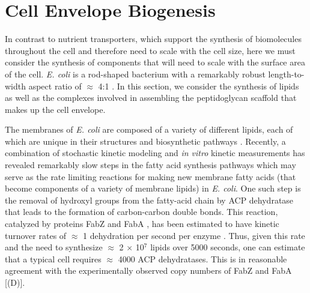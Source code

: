 \section{Cell Envelope Biogenesis}
In contrast to nutrient transporters, which support the synthesis of
biomolecules throughout the cell and therefore need to scale with the cell size,
here we must consider the synthesis of components that will need to scale with
the surface area of the cell. \textit{E. coli} is a rod-shaped bacterium with a
remarkably robust length-to-width aspect ratio of $\approx$ 4:1
\citep{harris2018, ojkic2019}. In this section, we consider the synthesis of
lipids as well as the complexes involved in assembling the peptidoglycan
scaffold that makes up the cell envelope.


The membranes of \textit{E. coli} are composed of a variety of different lipids,
each of which are unique in their structures and biosynthetic pathways
\citep{sohlenkamp2016}. Recently, a combination of stochastic kinetic modeling
\citep{ruppe2018} and \textit{in vitro} kinetic measurements
\citep{ranganathan2012, yu2011} has revealed remarkably slow steps in the fatty
acid synthesis pathways which may serve as the rate limiting reactions for
making new membrane fatty acids (that become components of a variety of
membrane lipids) in \textit{E. coli}. One such step is the removal of hydroxyl
groups from the fatty-acid chain by ACP dehydratase that leads to the formation
of carbon-carbon double bonds. This reaction, catalyzed by proteins FabZ and
FabA \citep{yu2011}, has been estimated to have kinetic
turnover rates of $\approx$ 1 dehydration per second per enzyme
\citep{ruppe2018}. Thus, given this rate and the need to synthesize $\approx$ 2
$\times$ 10$^7$ lipids over 5000 seconds, one can estimate that a typical cell
requires $\approx$ 4000 ACP dehydratases. This is in reasonable agreement with
the experimentally observed copy numbers of FabZ and FabA
[(D)].

